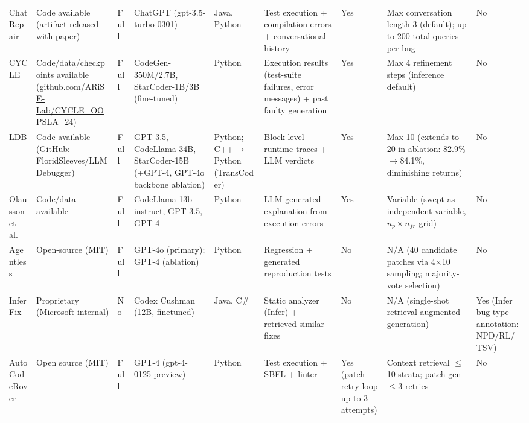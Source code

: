 \documentclass[10pt,a4paper]{article}
\begin{document}
\begin{table}[!t]
\begin{tabularx}{\textwidth}{@{}p{48pt}p{48pt}p{28pt}p{68pt}p{48pt}p{65pt}p{30pt}p{72pt}X@{}}
ChatRepair~\cite{xia2024chatrepair} & Code available (artifact released with paper) & Full & ChatGPT (gpt-3.5-turbo-0301) & Java, Python & Test execution + compilation errors + conversational history & Yes & Max conversation length 3 (default); up to 200 total queries per bug & No \\
CYCLE~\cite{ding2024cycle} & Code/data/checkpoints available (\url{github.com/ARiSE-Lab/CYCLE_OOPSLA_24}) & Full & CodeGen-350M/2.7B, StarCoder-1B/3B (fine-tuned) & Python & Execution results (test-suite failures, error messages) + past faulty generation & Yes & Max 4 refinement steps (inference default) & No \\
LDB~\cite{zhong2024ldb} & Code available (GitHub: FloridSleeves/LLMDebugger) & Full & GPT-3.5, CodeLlama-34B, StarCoder-15B (+GPT-4, GPT-4o backbone ablation) & Python; C++$\to$Python (TransCoder) & Block-level runtime traces + LLM verdicts & Yes & Max 10 (extends to 20 in ablation: 82.9\%$\to$84.1\%, diminishing returns) & No \\
Olausson et al.~\cite{olausson2024} & Code/data available & Full & CodeLlama-13b-instruct, GPT-3.5, GPT-4 & Python & LLM-generated explanation from execution errors & Yes & Variable (swept as independent variable, $n_p \times n_{fr}$ grid) & No \\
Agentless~\cite{xia2025agentless} & Open-source (MIT) & Full & GPT-4o (primary); GPT-4 (ablation) & Python & Regression + generated reproduction tests & No & N/A (40 candidate patches via 4$\times$10 sampling; majority-vote selection) & No \\
InferFix~\cite{jin2023inferfix} & Proprietary (Microsoft internal) & No & Codex Cushman (12B, finetuned) & Java, C\# & Static analyzer (Infer) + retrieved similar fixes & No & N/A (single-shot retrieval-augmented generation) & Yes (Infer bug-type annotation: NPD/RL/TSV) \\
AutoCodeRover~\cite{zhang2024autocoderover} & Open source (MIT) & Full & GPT-4 (gpt-4-0125-preview) & Python & Test execution + SBFL + linter & Yes (patch retry loop up to 3 attempts) & Context retrieval $\leq$10 strata; patch gen $\leq$3 retries & No \\
\bottomrule
\end{tabularx}
\end{table}
\end{document}

